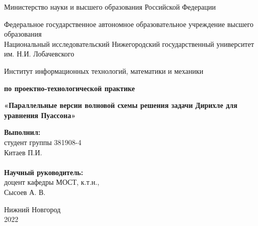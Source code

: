 \documentclass{report}
\begin{document}
\def\contentsname{Содержание}

\begin{titlepage}

\begin{center}
Министерство науки и высшего образования Российской Федерации
\end{center}

\begin{center}
Федеральное государственное автономное образовательное учреждение высшего образования \\
Национальный исследовательский Нижегородский государственный университет им. Н.И. Лобачевского
\end{center}

\begin{center}
Институт информационных технологий, математики и механики
\end{center}

\vspace{4em}

\begin{center}
\textbf{ по проектно-технологической практике}
\end{center}
\begin{center}
\textbf{\Large«Параллельные версии волновой схемы решения задачи Дирихле для уравнения Пуассона»}
\end{center}

\vspace{4em}

\newbox{\lbox}
\newlength{\maxl}
\setlength{\maxl}{\wd\lbox}
\hfill\parbox{7cm}{
\hspace*{5cm}\hspace*{-5cm}\textbf{Выполнил:} \\ студент группы 381908-4 \\ Китаев П.И. \\
\\
\hspace*{5cm}\hspace*{-5cm}\textbf{Научный руководитель:}\\ доцент кафедры МОСТ, к.т.н., \\ Сысоев А. В.\\}
\vspace{\fill}

\begin{center} Нижний Новгород \\ 2022 \end{center}
\end{titlepage}
\end{document}
